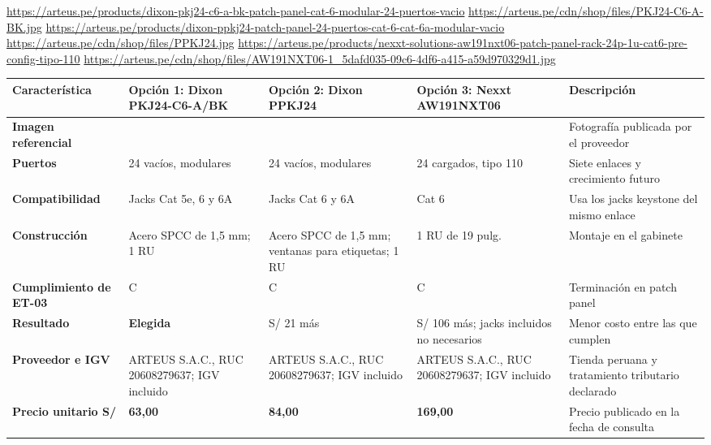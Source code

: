 \begin{landscape}
\urldef{\cotucj}\url{https://arteus.pe/products/dixon-pkj24-c6-a-bk-patch-panel-cat-6-modular-24-puertos-vacio}
\urldef{\cotuck}\url{https://arteus.pe/cdn/shop/files/PKJ24-C6-A-BK.jpg}
\urldef{\cotucl}\url{https://arteus.pe/products/dixon-ppkj24-patch-panel-24-puertos-cat-6-cat-6a-modular-vacio}
\urldef{\cotucm}\url{https://arteus.pe/cdn/shop/files/PPKJ24.jpg}
\urldef{\cotucn}\url{https://arteus.pe/products/nexxt-solutions-aw191nxt06-patch-panel-rack-24p-1u-cat6-pre-config-tipo-110}
\urldef{\cotuco}\url{https://arteus.pe/cdn/shop/files/AW191NXT06-1_5dafd035-09c6-4df6-a415-a59d970329d1.jpg}
\par\noindent\begin{minipage}{\linewidth}\formatofichas
{}\label{tab:cot-pp}
\begin{tabularx}{\linewidth}{@{}>{\raggedright\arraybackslash}p{3.0cm}YYY>{\raggedright\arraybackslash}p{4.4cm}@{}}
\toprule
\textbf{Característica} & \textbf{Opción 1: Dixon PKJ24-C6-A/BK} & \textbf{Opción 2: Dixon PPKJ24} & \textbf{Opción 3: Nexxt AW191NXT06} & \textbf{Descripción}\\\midrule
\textbf{Imagen referencial} &  &  &  & Fotografía publicada por el proveedor\\
\textbf{Puertos} & 24 vacíos, modulares & 24 vacíos, modulares & 24 cargados, tipo 110 & Siete enlaces y crecimiento futuro\\
\textbf{Compatibilidad} & Jacks Cat 5e, 6 y 6A & Jacks Cat 6 y 6A & Cat 6 & Usa los jacks keystone del mismo enlace\\
\textbf{Construcción} & Acero SPCC de 1,5 mm; 1 RU & Acero SPCC de 1,5 mm; ventanas para etiquetas; 1 RU & 1 RU de 19 pulg. & Montaje en el gabinete\\
\textbf{Cumplimiento de ET-03} & C & C & C & Terminación en patch panel\\
\textbf{Resultado} & \textbf{Elegida} & S/ 21 más & S/ 106 más; jacks incluidos no necesarios & Menor costo entre las que cumplen\\
\textbf{Proveedor e IGV} & ARTEUS S.A.C., RUC 20608279637; IGV incluido & ARTEUS S.A.C., RUC 20608279637; IGV incluido & ARTEUS S.A.C., RUC 20608279637; IGV incluido & Tienda peruana y tratamiento tributario declarado\\
\textbf{Precio unitario S/} & \textbf{63,00} & \textbf{84,00} & \textbf{169,00} & Precio publicado en la fecha de consulta\\

\end{tabularx}
\end{minipage}
\end{landscape}

